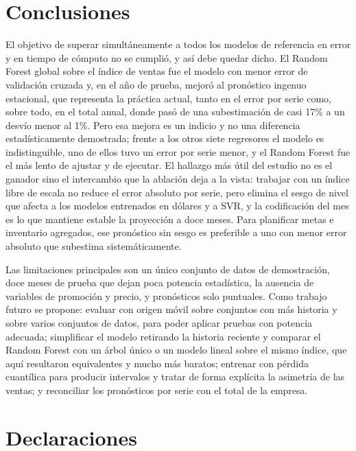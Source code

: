 \documentclass[pdflatex,sn-mathphys-num]{sn-jnl}
\begin{document}
\section{Conclusiones}\label{sec:conclusiones}

El objetivo de superar simultáneamente a todos los modelos de referencia en error y en tiempo de cómputo no se cumplió, y así debe quedar dicho. El Random Forest global sobre el índice de ventas fue el modelo con menor error de validación cruzada y, en el año de prueba, mejoró al pronóstico ingenuo estacional, que representa la práctica actual, tanto en el error por serie como, sobre todo, en el total anual, donde pasó de una subestimación de casi 17\% a un desvío menor al 1\%. Pero esa mejora es un indicio y no una diferencia estadísticamente demostrada; frente a los otros siete regresores el modelo es indistinguible, uno de ellos tuvo un error por serie menor, y el Random Forest fue el más lento de ajustar y de ejecutar. El hallazgo más útil del estudio no es el ganador sino el intercambio que la ablación deja a la vista: trabajar con un índice libre de escala no reduce el error absoluto por serie, pero elimina el sesgo de nivel que afecta a los modelos entrenados en dólares y a SVR, y la codificación del mes es lo que mantiene estable la proyección a doce meses. Para planificar metas e inventario agregados, ese pronóstico sin sesgo es preferible a uno con menor error absoluto que subestima sistemáticamente.

Las limitaciones principales son un único conjunto de datos de demostración, doce meses de prueba que dejan poca potencia estadística, la ausencia de variables de promoción y precio, y pronósticos solo puntuales. Como trabajo futuro se propone: evaluar con origen móvil sobre conjuntos con más historia y sobre varios conjuntos de datos, para poder aplicar pruebas con potencia adecuada; simplificar el modelo retirando la historia reciente y comparar el Random Forest con un árbol único o un modelo lineal sobre el mismo índice, que aquí resultaron equivalentes y mucho más baratos; entrenar con pérdida cuantílica para producir intervalos y tratar de forma explícita la asimetría de las ventas; y reconciliar los pronósticos por serie con el total de la empresa.

\backmatter

\section*{Declaraciones}
\end{document}
